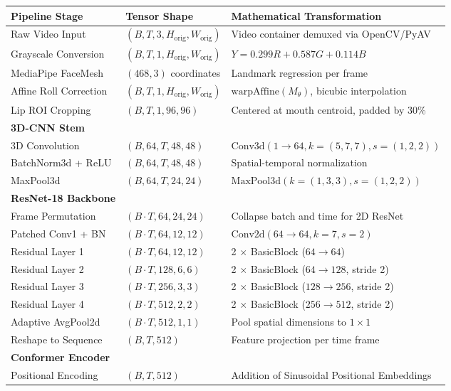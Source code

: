 \documentclass[11pt,a4paper]{report}
\begin{document}
\begin{longtable}{lll}
\toprule
\textbf{Pipeline Stage} & \textbf{Tensor Shape} & \textbf{Mathematical Transformation} \\
\midrule
\endhead
Raw Video Input & $(B, T, 3, H_{\text{orig}}, W_{\text{orig}})$ & Video container demuxed via OpenCV/PyAV \\
Grayscale Conversion & $(B, T, 1, H_{\text{orig}}, W_{\text{orig}})$ & $Y = 0.299R + 0.587G + 0.114B$ \\
MediaPipe FaceMesh & $(468, 3)$ coordinates & Landmark regression per frame \\
Affine Roll Correction & $(B, T, 1, H_{\text{orig}}, W_{\text{orig}})$ & $\text{warpAffine}(M_{\theta})$, bicubic interpolation \\
Lip ROI Cropping & $(B, T, 1, 96, 96)$ & Centered at mouth centroid, padded by 30\% \\
\midrule
\textbf{3D-CNN Stem} & & \\
3D Convolution & $(B, 64, T, 48, 48)$ & $\text{Conv3d}(1 \to 64, k=(5,7,7), s=(1,2,2))$ \\
BatchNorm3d + ReLU & $(B, 64, T, 48, 48)$ & Spatial-temporal normalization \\
MaxPool3d & $(B, 64, T, 24, 24)$ & $\text{MaxPool3d}(k=(1,3,3), s=(1,2,2))$ \\
\midrule
\textbf{ResNet-18 Backbone} & & \\
Frame Permutation & $(B \cdot T, 64, 24, 24)$ & Collapse batch and time for 2D ResNet \\
Patched Conv1 + BN & $(B \cdot T, 64, 12, 12)$ & $\text{Conv2d}(64 \to 64, k=7, s=2)$ \\
Residual Layer 1 & $(B \cdot T, 64, 12, 12)$ & 2 $\times$ BasicBlock ($64 \to 64$) \\
Residual Layer 2 & $(B \cdot T, 128, 6, 6)$ & 2 $\times$ BasicBlock ($64 \to 128$, stride 2) \\
Residual Layer 3 & $(B \cdot T, 256, 3, 3)$ & 2 $\times$ BasicBlock ($128 \to 256$, stride 2) \\
Residual Layer 4 & $(B \cdot T, 512, 2, 2)$ & 2 $\times$ BasicBlock ($256 \to 512$, stride 2) \\
Adaptive AvgPool2d & $(B \cdot T, 512, 1, 1)$ & Pool spatial dimensions to $1 \times 1$ \\
Reshape to Sequence & $(B, T, 512)$ & Feature projection per time frame \\
\midrule
\textbf{Conformer Encoder} & & \\
Positional Encoding & $(B, T, 512)$ & Addition of Sinusoidal Positional Embeddings \\

\end{longtable}
\end{document}
